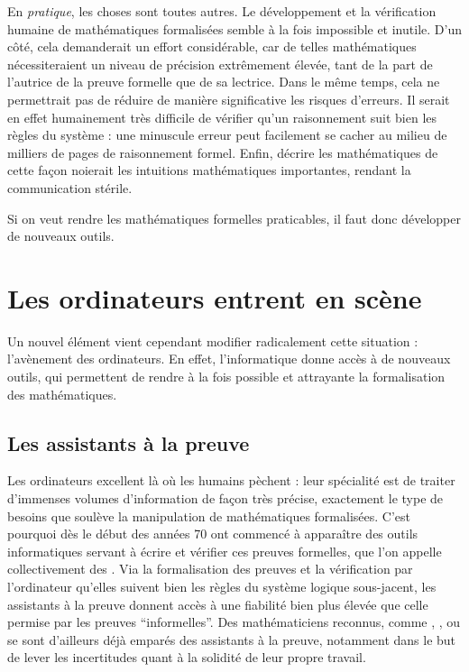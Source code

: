 En \emph{pratique}, les choses sont toutes autres.
Le développement et la vérification humaine de mathématiques
formalisées%
semble à la fois impossible et inutile.
D’un côté, cela demanderait un effort considérable, car de telles mathématiques
nécessiteraient un niveau de précision extrêmement élevée, tant de la part de l’autrice
de la preuve formelle que de sa lectrice.
Dans le même temps, cela ne permettrait pas de réduire de manière significative
les risques d’erreurs. Il serait en effet
humainement très difficile de vérifier qu’un raisonnement suit bien les règles du
système : une minuscule erreur peut facilement se cacher au milieu de
milliers de pages de raisonnement formel.
Enfin, décrire les mathématiques de cette façon noierait
les intuitions mathématiques importantes, rendant la communication stérile.

Si on veut rendre les mathématiques formelles praticables, il faut donc développer
de nouveaux outils.

\section{Les ordinateurs entrent en scène}
\label{sec:assistants-preuve}

Un nouvel élément vient cependant modifier radicalement cette situation :
l’avènement des ordinateurs. En effet, l’informatique donne accès à de nouveaux outils,
qui permettent de rendre à la fois possible et attrayante la formalisation
des mathématiques.

\subsection{Les assistants à la preuve}

Les ordinateurs excellent là où les humains pèchent : leur spécialité est de traiter
d’immenses volumes d’information de façon très précise, exactement le type
de besoins que soulève la manipulation de mathématiques formalisées. C’est pourquoi dès
le début des années 70%
%
%
ont commencé à apparaître des outils informatiques servant à écrire et vérifier ces
preuves formelles, que l’on appelle collectivement des .
Via la formalisation des preuves et la vérification par l’ordinateur qu’elles
suivent bien les règles du système logique sous-jacent, les assistants à la preuve
donnent accès à une fiabilité bien plus élevée que celle permise par les preuves
“informelles”.
Des mathématiciens reconnus, comme ,
, ou 
se sont d’ailleurs déjà emparés des assistants à la preuve,
notamment dans le but de lever les incertitudes
quant à la solidité de leur propre travail.

